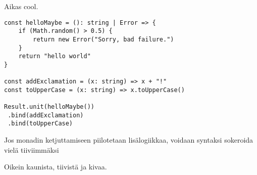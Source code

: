 Aikas cool.

\begin{code}
    \begin{verbatim}
const helloMaybe = (): string | Error => {
    if (Math.random() > 0.5) {
        return new Error("Sorry, bad failure.")
    }
    return "hello world"
}

const addExclamation = (x: string) => x + "!"
const toUpperCase = (x: string) => x.toUpperCase()

Result.unit(helloMaybe())
 .bind(addExclamation)
 .bind(toUpperCase)
\end{verbatim}
    \caption{Jos monadin ketjuttamiseen piilotetaan lisälogiikkaa, voidaan syntaksi sokeroida vielä tiiviimmäksi}
    \label{code:result_monad_example_2}
\end{code}

Oikein kaunista, tiivistä ja kivaa.